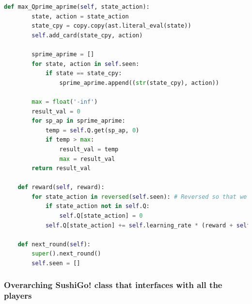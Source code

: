 \begin{lstlisting}[language=Python]
    def max_Qprime_aprime(self, state_action):
        state, action = state_action
        state_cpy = copy.copy(ast.literal_eval(state))
        self.add_card(state_cpy, action)

        sprime_aprime = []
        for state, action in self.seen:
            if state == state_cpy:
                sprime_aprime.append((str(state_cpy), action))
        
        max = float('-inf')
        result_val = 0
        for sp_ap in sprime_aprime:
            temp = self.Q.get(sp_ap, 0)
            if temp > max:
                result_val = temp
                max = result_val
        return result_val
    
    def reward(self, reward):
        for state_action in reversed(self.seen): # Reversed so that we access the "future" state_actions first and populate those entries
            if state_action not in self.Q:
                self.Q[state_action] = 0
            self.Q[state_action] += self.learning_rate * (reward + self.disc_factor * self.max_Qprime_aprime(state_action) - self.Q[state_action])
        
    def next_round(self):
        super().next_round()
        self.seen = []
\end{lstlisting}

\hypertarget{overarching-sushigo-class-that-interfaces-with-all-the-players}{%
\subsubsection{Overarching SushiGo! class that interfaces with all the
players}\label{overarching-sushigo-class-that-interfaces-with-all-the-players}}

